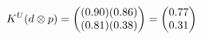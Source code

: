 \documentclass[preview]{standalone}
\begin{document}
\begin{align*}
\special{dvisvgm:raw <g id='unique000'>}K^U(d \otimes p) = \begin{pmatrix} (0.90)(0.86) \\ (0.81)(0.38) \end{pmatrix} = \begin{pmatrix} 0.77 \\ 0.31 \end{pmatrix}\special{dvisvgm:raw </g>}
\end{align*}
\end{document}
